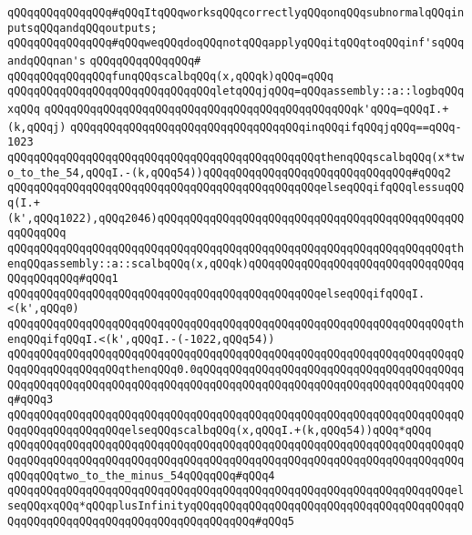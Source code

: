 \verb|qQQqqQQqqQQqqQQq#qQQqItqQQqworksqQQqcorrectlyqQQqonqQQqsubnormalqQQqinputsqQQqandqQQqoutputs;|\newline
\verb|qQQqqQQqqQQqqQQq#qQQqweqQQqdoqQQqnotqQQqapplyqQQqitqQQqtoqQQqinf'sqQQqandqQQqnan's|\newline
\verb|qQQqqQQqqQQqqQQq#|\newline
\verb|qQQqqQQqqQQqqQQqfunqQQqscalbqQQq(x,qQQqk)qQQq=qQQq|\newline
\verb|qQQqqQQqqQQqqQQqqQQqqQQqqQQqqQQqletqQQqjqQQq=qQQqassembly::a::logbqQQqxqQQq|\newline
\verb|qQQqqQQqqQQqqQQqqQQqqQQqqQQqqQQqqQQqqQQqqQQqqQQqk'qQQq=qQQqI.+(k,qQQqj)|\newline
\verb|qQQqqQQqqQQqqQQqqQQqqQQqqQQqqQQqqQQqinqQQqifqQQqjqQQq==qQQq-1023|\newline
\verb|qQQqqQQqqQQqqQQqqQQqqQQqqQQqqQQqqQQqqQQqqQQqqQQqthenqQQqscalbqQQq(x*two_to_the_54,qQQqI.-(k,qQQq54))qQQqqQQqqQQqqQQqqQQqqQQqqQQqqQQq#qQQq2|\newline
\verb|qQQqqQQqqQQqqQQqqQQqqQQqqQQqqQQqqQQqqQQqqQQqqQQqelseqQQqifqQQqlessuqQQq(I.+(k',qQQq1022),qQQq2046)qQQqqQQqqQQqqQQqqQQqqQQqqQQqqQQqqQQqqQQqqQQqqQQqqQQqqQQq|\newline
\verb|qQQqqQQqqQQqqQQqqQQqqQQqqQQqqQQqqQQqqQQqqQQqqQQqqQQqqQQqqQQqqQQqqQQqthenqQQqassembly::a::scalbqQQq(x,qQQqk)qQQqqQQqqQQqqQQqqQQqqQQqqQQqqQQqqQQqqQQqqQQq#qQQq1|\newline
\verb|qQQqqQQqqQQqqQQqqQQqqQQqqQQqqQQqqQQqqQQqqQQqqQQqelseqQQqifqQQqI.<(k',qQQq0)|\newline
\verb|qQQqqQQqqQQqqQQqqQQqqQQqqQQqqQQqqQQqqQQqqQQqqQQqqQQqqQQqqQQqqQQqqQQqthenqQQqifqQQqI.<(k',qQQqI.-(-1022,qQQq54))|\newline
\verb|qQQqqQQqqQQqqQQqqQQqqQQqqQQqqQQqqQQqqQQqqQQqqQQqqQQqqQQqqQQqqQQqqQQqqQQqqQQqqQQqqQQqqQQqthenqQQq0.0qQQqqQQqqQQqqQQqqQQqqQQqqQQqqQQqqQQqqQQqqQQqqQQqqQQqqQQqqQQqqQQqqQQqqQQqqQQqqQQqqQQqqQQqqQQqqQQqqQQqqQQqqQQqqQQq#qQQq3|\newline
\verb|qQQqqQQqqQQqqQQqqQQqqQQqqQQqqQQqqQQqqQQqqQQqqQQqqQQqqQQqqQQqqQQqqQQqqQQqqQQqqQQqqQQqqQQqelseqQQqscalbqQQq(x,qQQqI.+(k,qQQq54))qQQq*qQQq|\newline
\verb|qQQqqQQqqQQqqQQqqQQqqQQqqQQqqQQqqQQqqQQqqQQqqQQqqQQqqQQqqQQqqQQqqQQqqQQqqQQqqQQqqQQqqQQqqQQqqQQqqQQqqQQqqQQqqQQqqQQqqQQqqQQqqQQqqQQqqQQqqQQqqQQqqQQqtwo_to_the_minus_54qQQqqQQq#qQQq4|\newline
\verb|qQQqqQQqqQQqqQQqqQQqqQQqqQQqqQQqqQQqqQQqqQQqqQQqqQQqqQQqqQQqqQQqqQQqelseqQQqxqQQq*qQQqplusInfinityqQQqqQQqqQQqqQQqqQQqqQQqqQQqqQQqqQQqqQQqqQQqqQQqqQQqqQQqqQQqqQQqqQQqqQQqqQQqqQQq#qQQq5|\newline
